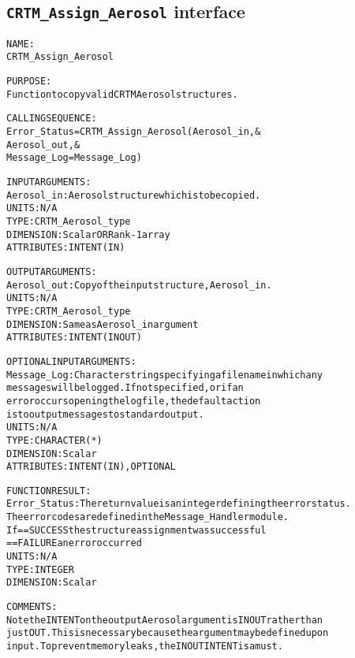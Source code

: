 \subsection{\texttt{CRTM\_Assign\_Aerosol} interface}
  \label{sec:CRTM_Assign_Aerosol_interface}
  \begin{alltt}
 
  NAME:
        CRTM_Assign_Aerosol
 
  PURPOSE:
        Function to copy valid CRTM Aerosol structures.
 
  CALLING SEQUENCE:
        Error_Status = CRTM_Assign_Aerosol( Aerosol_in             , &
                                            Aerosol_out            , &
                                            Message_Log=Message_Log  )
 
  INPUT ARGUMENTS:
        Aerosol_in:      Aerosol structure which is to be copied.
                         UNITS:      N/A
                         TYPE:       CRTM_Aerosol_type
                         DIMENSION:  Scalar OR Rank-1 array
                         ATTRIBUTES: INTENT(IN)
 
  OUTPUT ARGUMENTS:
        Aerosol_out:     Copy of the input structure, Aerosol_in.
                         UNITS:      N/A
                         TYPE:       CRTM_Aerosol_type
                         DIMENSION:  Same as Aerosol_in argument
                         ATTRIBUTES: INTENT(IN OUT)
 
 
  OPTIONAL INPUT ARGUMENTS:
        Message_Log:     Character string specifying a filename in which any
                         messages will be logged. If not specified, or if an
                         error occurs opening the log file, the default action
                         is to output messages to standard output.
                         UNITS:      N/A
                         TYPE:       CHARACTER(*)
                         DIMENSION:  Scalar
                         ATTRIBUTES: INTENT(IN), OPTIONAL
 
  FUNCTION RESULT:
        Error_Status:    The return value is an integer defining the error status.
                         The error codes are defined in the Message_Handler module.
                         If == SUCCESS the structure assignment was successful
                            == FAILURE an error occurred
                         UNITS:      N/A
                         TYPE:       INTEGER
                         DIMENSION:  Scalar
 
  COMMENTS:
        Note the INTENT on the output Aerosol argument is IN OUT rather than
        just OUT. This is necessary because the argument may be defined upon
        input. To prevent memory leaks, the IN OUT INTENT is a must.
 
  \end{alltt}
